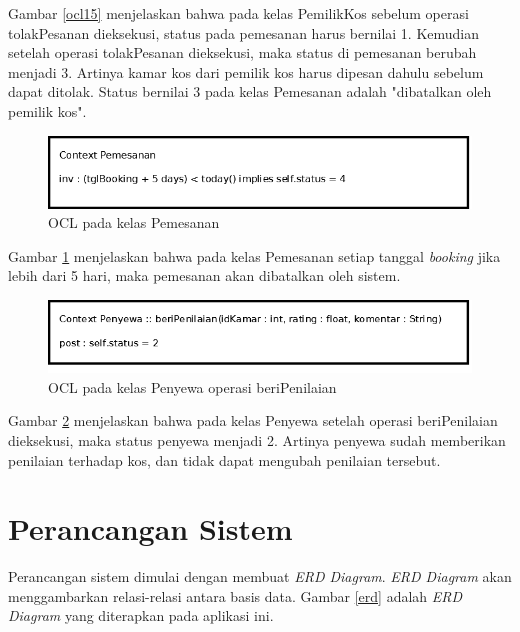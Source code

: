 	Gambar \ref{ocl15} menjelaskan bahwa pada kelas PemilikKos sebelum operasi tolakPesanan dieksekusi, status pada pemesanan harus bernilai 1. Kemudian setelah operasi tolakPesanan dieksekusi, maka status di pemesanan berubah menjadi 3. Artinya kamar kos dari pemilik kos harus dipesan dahulu sebelum dapat ditolak. Status bernilai 3 pada kelas Pemesanan adalah "dibatalkan oleh pemilik kos".
	
	\begin{figure}[H]
		\centering
		\includegraphics[width=\textwidth]{gambar/ocl/batalsistem}
		\caption{OCL pada kelas Pemesanan}
		\label{ocl16}
	\end{figure}
	
	Gambar \ref{ocl16} menjelaskan bahwa pada kelas Pemesanan setiap tanggal \textit{booking} jika lebih dari 5 hari, maka pemesanan akan dibatalkan oleh sistem.
	
	\begin{figure}[H]
		\centering
		\includegraphics[width=\textwidth]{gambar/ocl/beripenilaian}
		\caption{OCL pada kelas Penyewa operasi beriPenilaian}
		\label{ocl17}
	\end{figure}
	
	Gambar \ref{ocl17} menjelaskan bahwa pada kelas Penyewa setelah operasi beriPenilaian dieksekusi, maka status penyewa menjadi 2. Artinya penyewa sudah memberikan penilaian terhadap kos, dan tidak dapat mengubah penilaian tersebut.
	
	\section{Perancangan Sistem}
		Perancangan sistem dimulai dengan membuat \textit{ERD Diagram}. \textit{ERD Diagram }akan menggambarkan relasi-relasi antara basis data. Gambar \ref{erd} adalah \textit{ERD Diagram }yang diterapkan pada aplikasi ini.
		
